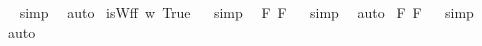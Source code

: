 \begin{isabellebody}
\isadelimproof
\ %
\endisadelimproof
%
\isatagproof
{}\isamarkupfalse%
\ {\isacharparenleft}simp{\isacharparenright}\ \isamarkupfalse%
\ auto%
\endisatagproof
{\isafoldproof}%
%
\isadelimproof
%
\endisadelimproof
\isanewline
\isanewline
{}\isamarkupfalse%
\ {\isachardoublequoteopen}isWff\ {\isacharcomma}{\isacharparenleft}{\isasymlambda}w{\isachardot}\ True{\isacharparenright}{\isacharcomma}{\isachardoublequoteclose}%
\isadelimproof
\ %
\endisadelimproof
%
\isatagproof
{}\isamarkupfalse%
\ {\isacharparenleft}simp{\isacharparenright}\ \isamarkupfalse%
%
\endisatagproof
{\isafoldproof}%
%
\isadelimproof
%
\endisadelimproof
\isanewline
\isanewline
{}\isamarkupfalse%
\ {\isachardoublequoteopen}{\isacharbrackleft}{\isacharparenleft}{\isasymexists}{\isacharparenleft}{\isasymlambda}F{\isachardot}\ {\isacharcomma}F{\isacharcomma}{\isacharparenright}{\isacharparenright}{\isacharbrackright}{\isachardoublequoteclose}%
\isadelimproof
\ %
\endisadelimproof
%
\isatagproof
{}\isamarkupfalse%
\ {\isacharparenleft}simp{\isacharparenright}\ \isamarkupfalse%
\ auto%
\endisatagproof
{\isafoldproof}%
%
\isadelimproof
%
\endisadelimproof
\isanewline
{}\isamarkupfalse%
\ {\isachardoublequoteopen}{\isacharbrackleft}{\isacharparenleft}{\isasymexists}{\isacharparenleft}{\isasymlambda}F{\isachardot}\ {\isacharsemicolon}F{\isacharsemicolon}{\isacharparenright}{\isacharparenright}{\isacharbrackright}{\isachardoublequoteclose}%
\isadelimproof
\ %
\endisadelimproof
%
\isatagproof
{}\isamarkupfalse%
\ {\isacharparenleft}simp{\isacharparenright}\ \isamarkupfalse%
\ auto\isanewline
%
\endisatagproof
{\isafoldproof}%
%
\isadelimproof
%
\endisadelimproof
%
\isadelimtheory
%
\endisadelimtheory
%
\isatagtheory
%
\endisatagtheory
{\isafoldtheory}%
%
\isadelimtheory
%
\endisadelimtheory
\end{isabellebody}%

